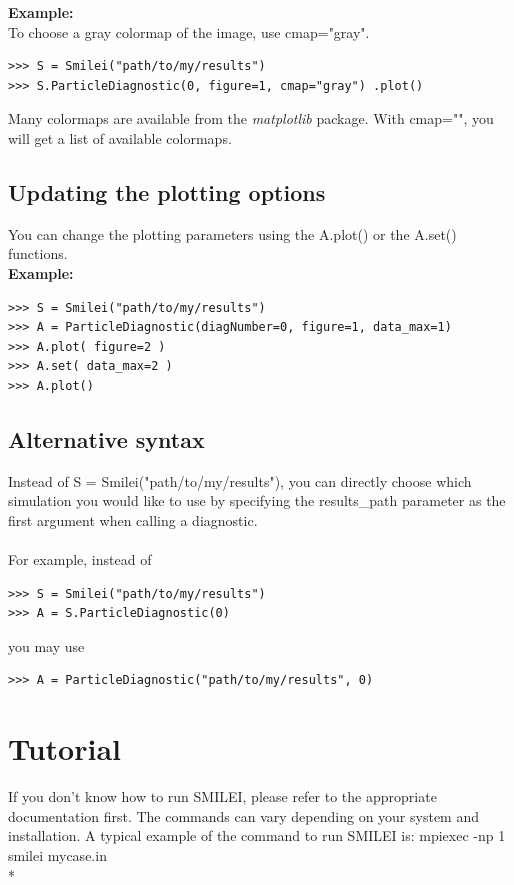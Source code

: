 \documentclass[11pt]{article}
\newcommand{\code}[1]{\colorbox{yellow!15}{\ttfamily #1}}
\begin{document}
\textbf{Example:}\\
To choose a gray colormap of the image, use \code{cmap="gray"}.
\begin{lstlisting}
>>> S = Smilei("path/to/my/results")
>>> S.ParticleDiagnostic(0, figure=1, cmap="gray") .plot()
\end{lstlisting}
Many colormaps are available from the \textit{matplotlib} package. With \code{cmap=""}, you will get a list of available colormaps.


\subsection{Updating the plotting options}

You can change the plotting parameters using the \code{A.plot()} or the \code{A.set()} functions.\\
\textbf{Example:}
\begin{lstlisting}
>>> S = Smilei("path/to/my/results")
>>> A = ParticleDiagnostic(diagNumber=0, figure=1, data_max=1)
>>> A.plot( figure=2 )
>>> A.set( data_max=2 )
>>> A.plot()
\end{lstlisting}


\subsection{Alternative syntax}

Instead of \code{S = Smilei("path/to/my/results")}, you can directly choose which simulation you would like to use
by specifying the \code{results\_path} parameter as the first argument when calling a diagnostic.\\
\\
For example, instead of 
\begin{lstlisting}
>>> S = Smilei("path/to/my/results")
>>> A = S.ParticleDiagnostic(0)
\end{lstlisting}
you may use
\begin{lstlisting}
>>> A = ParticleDiagnostic("path/to/my/results", 0)
\end{lstlisting}


\clearpage


\section{Tutorial}

If you don't know how to run SMILEI, please refer to the appropriate documentation first. The commands can vary depending on your system and installation. A typical example of the command to run SMILEI is: \code{mpiexec -np 1 smilei mycase.in}\\*
\end{document}
